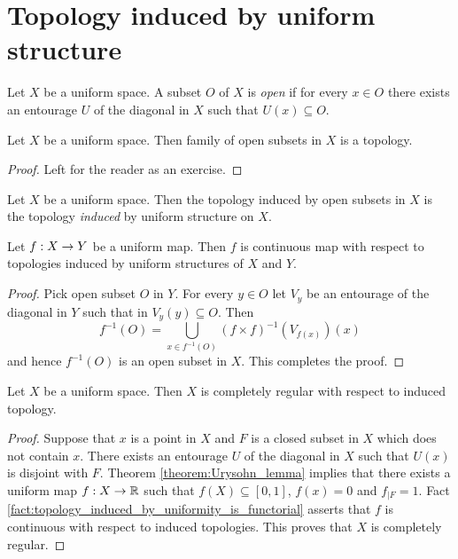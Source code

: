 \documentclass[10pt]{amsart}
\begin{document}
\section{Topology induced by uniform structure}

\begin{definition}
	Let $X$ be a uniform space. A subset $O$ of $X$ is \textit{open} if for every $x\in O$ there exists an entourage $U$ of the diagonal in $X$ such that $U(x) \subseteq O$.
\end{definition}

\begin{fact}\label{fact:topology_induced_by_uniform_structure}
	Let $X$ be a uniform space. Then family of open subsets in $X$ is a topology.
\end{fact}
\begin{proof}
	Left for the reader as an exercise.
\end{proof}

\begin{definition}
	Let $X$ be a uniform space. Then the topology induced by open subsets in $X$ is the topology \textit{induced} by uniform structure on $X$.
\end{definition}

\begin{fact}\label{fact:topology_induced_by_uniformity_is_functorial}
	Let $f:X \rightarrow Y$ be a uniform map. Then $f$ is continuous map with respect to topologies induced by uniform structures of $X$ and $Y$.
\end{fact}
\begin{proof}
	Pick open subset $O$ in $Y$. For every $y \in O$ let $V_y$ be an entourage of the diagonal in $Y$ such that in $V_y(y) \subseteq O$. Then
	$$f^{-1}(O) = \bigcup_{x \in f^{-1}(O)}\left(f\times f\right)^{-1}(V_{f(x)})\left(x\right)$$
	and hence $f^{-1}(O)$ is an open subset in $X$. This completes the proof.
\end{proof}

\begin{corollary}\label{corollary:uniform_spaces_are_completely_regular}
	Let $X$ be a uniform space. Then $X$ is completely regular with respect to induced topology.
\end{corollary}
\begin{proof}
	Suppose that $x$ is a point in $X$ and $F$ is a closed subset in $X$ which does not contain $x$. There exists an entourage $U$ of the diagonal in $X$ such that $U(x)$ is disjoint with $F$. Theorem \ref{theorem:Urysohn_lemma} implies that there exists a uniform map $f:X\rightarrow {\mathbb R}$ such that $f(X) \subseteq [0,1]$, $f(x) = 0$ and $f_{\mid F} = 1$. Fact \ref{fact:topology_induced_by_uniformity_is_functorial} asserts that $f$ is continuous with respect to induced topologies. This proves that $X$ is completely regular.
\end{proof}
\end{document}
